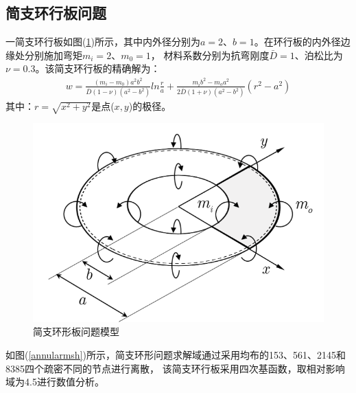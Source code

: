 \subsection{简支环行板问题}
一简支环行板如图(\ref{annular})所示，其中内外径分别为$a=2$、$b=1$。在环行板的内外径边缘处分别施加弯矩$m_i=2$、$m_0=1$，
材料系数分别为抗弯刚度$\bar{D}=1$、泊松比为$\nu=0.3$。该简支环行板的精确解为：
\begin{equation}
\begin{split}
    w=\frac{(m_i-m_0)a^2b^2}{\bar D(1-\nu)(a^2-b^2)}ln\frac{r}{a}+\frac{m_ib^2-m_oa^2}{2\bar D(1+\nu)(a^2-b^2)}(r^2-a^2)
\end{split}
\end{equation}
其中：$r=\sqrt{x^2+y^2}$是点($x,y$)的极径。
\begin{figure}[H]
    \centering
    \includegraphics[scale=0.7]{figure/PHR/A/annular.png}
    \caption{简支环形板问题模型}\label{annular}
\end{figure}
如图(\ref{annularmsh})所示，简支环形问题求解域通过采用均布的153、561、2145和8385四个疏密不同的节点进行离散，
该简支环行板采用四次基函数，取相对影响域为4.5进行数值分析。\par
